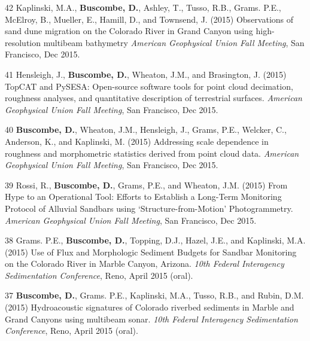 \documentclass[margin,line]{resume}
\begin{document}
\begin{resume}
\begin{footnotesize}
\begin{list1}
        \item[42] Kaplinski, M.A., {\bf Buscombe, D.}, Ashley, T., Tusso, R.B., Grams. P.E., McElroy, B., Mueller, E., Hamill, D., and Townsend, J. (2015) Observations of sand dune migration on the Colorado River in Grand Canyon using high-resolution multibeam bathymetry {\sl American Geophysical Union Fall Meeting}, San Francisco, Dec 2015.\\

        \item[41] Hensleigh, J., {\bf Buscombe, D.}, Wheaton, J.M., and Brasington, J. (2015) TopCAT and PySESA: Open-source software tools for point cloud decimation, roughness analyses, and quantitative description of terrestrial surfaces. {\sl American Geophysical Union Fall Meeting}, San Francisco, Dec 2015.\\  
        
        \item[40] {\bf Buscombe, D.}, Wheaton, J.M., Hensleigh, J., Grams, P.E., Welcker, C., Anderson, K., and Kaplinski, M. (2015) Addressing scale dependence in roughness and morphometric statistics derived from point cloud data. {\sl American Geophysical Union Fall Meeting}, San Francisco, Dec 2015.\\    
        
        \item[39] Rossi, R., {\bf Buscombe, D.}, Grams, P.E., and Wheaton, J.M. (2015) From Hype to an Operational Tool: Efforts to Establish a Long-Term Monitoring Protocol of Alluvial Sandbars using `Structure-from-Motion' Photogrammetry. {\sl American Geophysical Union Fall Meeting}, San Francisco, Dec 2015.\\        

        \item[38] Grams. P.E., {\bf Buscombe, D.}, Topping, D.J., Hazel, J.E., and Kaplinski, M.A. (2015) Use of Flux and Morphologic Sediment Budgets for Sandbar Monitoring on the Colorado River in Marble Canyon, Arizona. {\sl 10th Federal Interagency Sedimentation Conference}, Reno, April 2015 (oral).\\

        \item[37] {\bf Buscombe, D.}, Grams. P.E., Kaplinski, M.A., Tusso, R.B., and Rubin, D.M. (2015) Hydroacoustic signatures of Colorado riverbed sediments in Marble and Grand Canyons using multibeam sonar. {\sl 10th Federal Interagency Sedimentation Conference}, Reno, April 2015 (oral).\\


\end{list1}
\end{footnotesize}
\end{resume}
\end{document}
